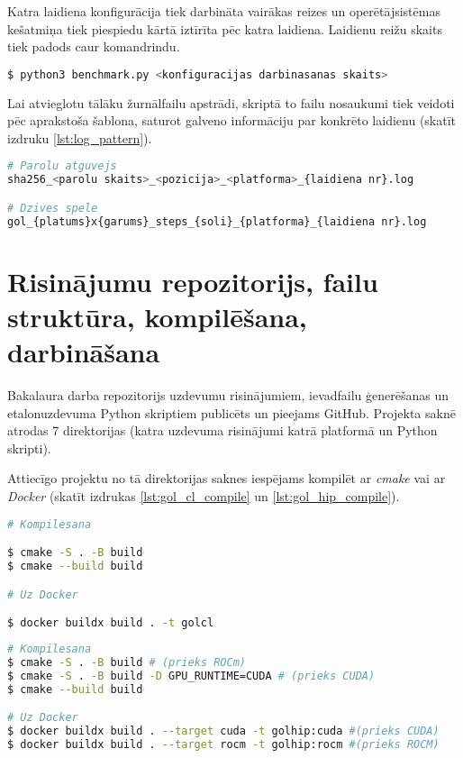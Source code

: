Katra laidiena konfigurācija tiek darbināta vairākas reizes un operētājsistēmas
kešatmiņa tiek piespiedu kārtā iztīrīta pēc katra laidiena. Laidienu reižu
skaits tiek padods caur komandrindu.

\begin{lstlisting}[caption={Etalonuzdevumu darbināšanas Python skripta darbināšana},
    captionpos=b,
    label=lst:bench_cli, language=bash]
$ python3 benchmark.py <konfiguracijas darbinasanas skaits>
\end{lstlisting}

Lai atvieglotu tālāku žurnālfailu apstrādi, skriptā to failu nosaukumi tiek
veidoti pēc aprakstoša šablona, saturot galveno informāciju par konkrēto
laidienu (skatīt izdruku \ref{lst:log_pattern}).
\begin{lstlisting}[caption={Žurnālfailu nosaukumu šabloni},
    captionpos=b,
    label=lst:log_pattern, language=bash]
# Parolu atguvejs
sha256_<parolu skaits>_<pozicija>_<platforma>_{laidiena nr}.log

# Dzives spele
gol_{platums}x{garums}_steps_{soli}_{platforma}_{laidiena nr}.log
\end{lstlisting}




\section{Risinājumu repozitorijs, failu struktūra, kompilēšana, darbināšana}
Bakalaura darba repozitorijs uzdevumu risinājumiem,
ievadfailu ģenerēšanas un etalonuzdevuma Python skriptiem publicēts un pieejams
GitHub.\cite{bak_github_repo} Projekta saknē atrodas 7 direktorijas (katra uzdevuma
risinājumi katrā platformā un Python skripti).

Attiecīgo projektu no tā direktorijas saknes iespējams kompilēt ar \textit{cmake}
vai ar \textit{Docker} (skatīt izdrukas \ref{lst:gol_cl_compile} un \ref{lst:gol_hip_compile}).

\begin{lstlisting}[caption={OpenCL un CUDA risinājumu kompilēšana},
    captionpos=b,
    label=lst:gol_cl_compile, language=bash]
# Kompilesana

$ cmake -S . -B build
$ cmake --build build

# Uz Docker

$ docker buildx build . -t golcl
\end{lstlisting}

\begin{lstlisting}[caption={ROCm HIP risinājumu kompilēšana},
    captionpos=b,
    label=lst:gol_hip_compile, language=bash]
# Kompilesana 
$ cmake -S . -B build # (prieks ROCm)
$ cmake -S . -B build -D GPU_RUNTIME=CUDA # (prieks CUDA)
$ cmake --build build

# Uz Docker
$ docker buildx build . --target cuda -t golhip:cuda #(prieks CUDA)
$ docker buildx build . --target rocm -t golhip:rocm #(prieks ROCM)
\end{lstlisting}


